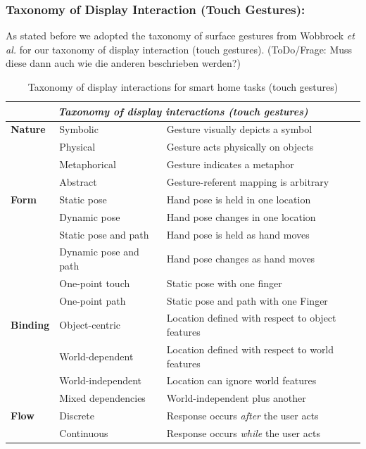 \documentclass[sigchi]{acmart}
\begin{document}
	\subsubsection{Taxonomy of Display Interaction (Touch Gestures):}	
	As stated before we adopted the taxonomy of surface gestures from Wobbrock \textit{et al.} \citep{Wobbrock.2009} for our taxonomy of display interaction (touch gestures). (ToDo/Frage: Muss diese dann auch wie die anderen beschrieben werden?)
	\begin{table}[t]
		\begin{center}
			\caption{Taxonomy of display interactions for smart home tasks (touch gestures)}
			\label{tab:taxDisplayTG}
			\begin{footnotesize}
				\begin{tabular}{p{} p{} p{}} \toprule
					\multicolumn{3}{c}{\textit{Taxonomy of display interactions (touch gestures)}} \\ \midrule
					\textbf{Nature}		& Symbolic				& Gesture visually depicts a symbol \\
										& Physical				& Gesture acts physically on objects \\ 
										& Metaphorical 			& Gesture indicates a metaphor \\ 
										& Abstract				& Gesture-referent mapping is arbitrary \\ \midrule
					\textbf{Form} 		& Static pose			& Hand pose is held in one location \\
										& Dynamic pose			& Hand pose changes in one location \\
										& Static pose and path 	& Hand pose is held as hand moves \\
										& Dynamic pose and path	& Hand pose changes as hand moves \\
										& One-point touch		& Static pose with one finger \\ 
										& One-point path		& Static pose and path with one Finger \\ \midrule
					\textbf{Binding}	& Object-centric 		& Location defined with respect to object features \\
										& World-dependent 		& Location defined with respect to world features \\
										& World-independent 	& Location can ignore world features \\
										& Mixed dependencies	& World-independent plus another \\ \midrule
					\textbf{Flow}		& Discrete				& Response occurs \textit{after} the user acts \\ 
										& Continuous 			& Response occurs \textit{while} the user acts  \\ \bottomrule
				\end{tabular}
			\end{footnotesize}
		\end{center}
	\end{table}
\end{document}
